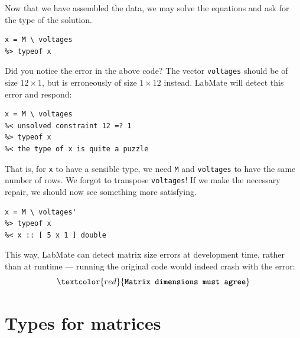 \documentclass{IMEKO2024}
\begin{document}
Now that we have assembled the data, we may solve the equations and ask for the type of the solution.
\begin{verbatim}
x = M \ voltages
%> typeof x
\end{verbatim}
Did you notice the error in the above code? The vector \texttt{voltages} should be of size $12 \times 1$, but is erroneously of size $1 \times 12$ instead. LabMate will detect this error and respond:

\begin{verbatim}
x = M \ voltages
%< unsolved constraint 12 =? 1
%> typeof x
%< the type of x is quite a puzzle
\end{verbatim}
%
That is, for \texttt{x} to have a sensible type, we need \texttt{M} and \texttt{voltages} to have the same number of rows. We forgot to transpose \texttt{voltages}! If we make the necessary repair, we should now see something more satisfying.
\begin{verbatim}
x = M \ voltages'
%> typeof x
%< x :: [ 5 x 1 ] double
\end{verbatim}
This way, LabMate can detect matrix size errors at development time, rather than at runtime --- running the original code would indeed crash with the error:
\[\textcolor{red}{\textbf{\texttt{Matrix dimensions must agree}}}\]

\section{Types for matrices}

\newcommand{\rs}{\mathit{rs}}
\newcommand{\ms}{\mathit{ms}}
\newcommand{\cs}{\mathit{cs}}
\end{document}
